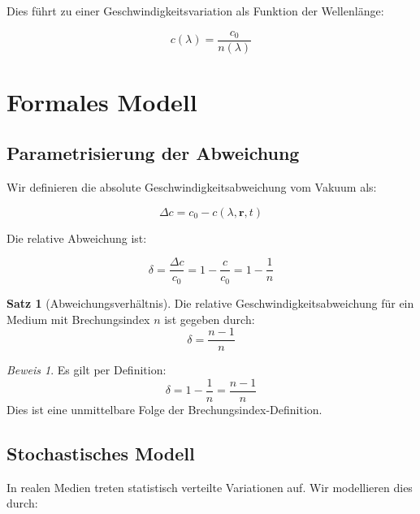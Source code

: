 \documentclass[a4paper,12pt]{article}
\theoremstyle{definition}
\newtheorem{satz}{Satz}[section]
\theoremstyle{remark}
\newtheorem*{beweis}{Beweis}
\newcommand{\cLight}{c}
\newcommand{\refIndex}{n}
\newcommand{\deviation}{\Delta}
\begin{document}
Dies führt zu einer Geschwindigkeitsvariation als Funktion der Wellenlänge:

\begin{equation}
    \cLight(\lambda) = \frac{\cLight_0}{\refIndex(\lambda)}
\end{equation}

\section{Formales Modell}

\subsection{Parametrisierung der Abweichung}

Wir definieren die absolute Geschwindigkeitsabweichung vom Vakuum als:

\begin{equation}
    \deviation \cLight = \cLight_0 - \cLight(\lambda, \mathbf{r}, t)
\end{equation}

Die relative Abweichung ist:

\begin{equation}
    \delta = \frac{\deviation \cLight}{\cLight_0} = 1 - \frac{\cLight}{\cLight_0} = 1 - \frac{1}{\refIndex}
\end{equation}

\begin{satz}[Abweichungsverhältnis]
Die relative Geschwindigkeitsabweichung für ein Medium mit Brechungsindex $\refIndex$ ist gegeben durch:
\begin{equation}
    \delta = \frac{\refIndex - 1}{\refIndex}
\end{equation}
\end{satz}

\begin{beweis}
Es gilt per Definition:
\begin{equation}
    \delta = 1 - \frac{1}{\refIndex} = \frac{\refIndex - 1}{\refIndex}
\end{equation}
Dies ist eine unmittelbare Folge der Brechungsindex-Definition.
\end{beweis}

\subsection{Stochastisches Modell}

In realen Medien treten statistisch verteilte Variationen auf. Wir modellieren dies durch:
\end{document}
